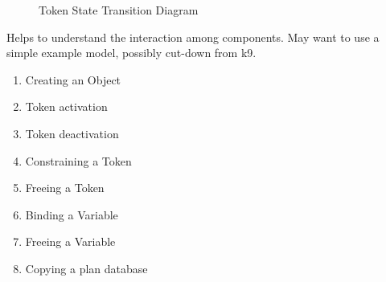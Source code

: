 \documentclass[10pt, letterpaper, twoside]{article}
\begin{document}

\begin{figure}[t]
\centering{}
\caption{Token State Transition Diagram}
\label{TokenStateModel}
\end{figure}

Helps to understand the interaction among components. May want to use
a simple example model, possibly cut-down from k9.
\begin{enumerate}
\item Creating an Object
\item Token activation
\item Token deactivation
\item Constraining a Token
\item Freeing a Token
\item Binding a Variable
\item Freeing a Variable
\item Copying a plan database
\end{enumerate}
\end{document}
